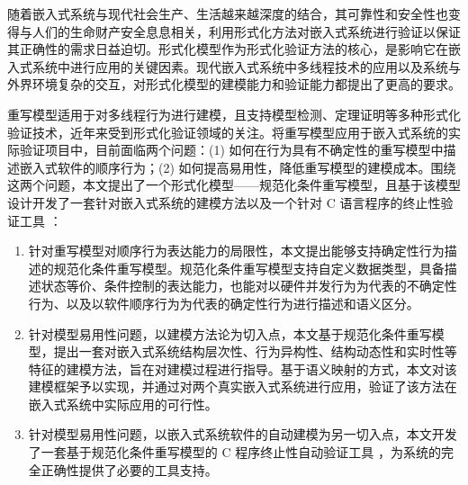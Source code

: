 \begin{cabstract}
随着嵌入式系统与现代社会生产、生活越来越深度的结合，其可靠性和安全性也变得与人们的生命财产安全息息相关，利用形式化方法对嵌入式系统进行验证以保证其正确性的需求日益迫切。形式化模型作为形式化验证方法的核心，是影响它在嵌入式系统中进行应用的关键因素。现代嵌入式系统中多线程技术的应用以及系统与外界环境复杂的交互，对形式化模型的建模能力和验证能力都提出了更高的要求。

重写模型适用于对多线程行为进行建模，且支持模型检测、定理证明等多种形式化验证技术，近年来受到形式化验证领域的关注。将重写模型应用于嵌入式系统的实际验证项目中，目前面临两个问题：(1) 如何在行为具有不确定性的重写模型中描述嵌入式软件的顺序行为；(2) 如何提高易用性，降低重写模型的建模成本。围绕这两个问题，本文提出了一个形式化模型——规范化条件重写模型，且基于该模型设计开发了一套针对嵌入式系统的建模方法以及一个针对 C 语言程序的终止性验证工具 \CTerm：

\begin{enumerate}
\item
针对重写模型对顺序行为表达能力的局限性，本文提出能够支持确定性行为描述的规范化条件重写模型。规范化条件重写模型支持自定义数据类型，具备描述状态等价、条件控制的表达能力，也能对以硬件并发行为为代表的不确定性行为、以及以软件顺序行为为代表的确定性行为进行描述和语义区分。
\item
针对模型易用性问题，以建模方法论为切入点，本文基于规范化条件重写模型，提出一套对嵌入式系统结构层次性、行为异构性、结构动态性和实时性等特征的建模方法，旨在对建模过程进行指导。基于语义映射的方式，本文对该建模框架予以实现，并通过对两个真实嵌入式系统进行应用，验证了该方法在嵌入式系统中实际应用的可行性。
\item 
针对模型易用性问题，以嵌入式系统软件的自动建模为另一切入点，本文开发了一套基于规范化条件重写模型的 C 程序终止性自动验证工具 \CTerm，为系统的完全正确性提供了必要的工具支持。
\end{enumerate}
\end{cabstract}


